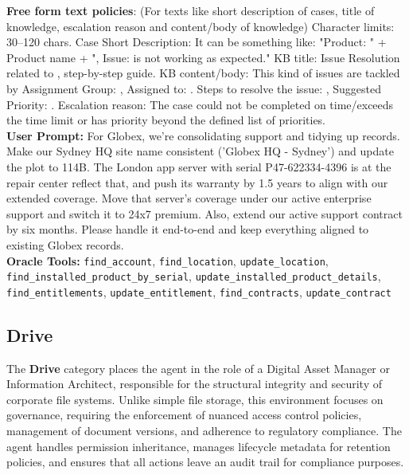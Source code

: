 \begin{taskbox}
\textbf{Free form text policies}: (For texts like short description of cases, title of knowledge, escalation reason and content/body of knowledge) Character limits: 30–120 chars. Case Short Description: It can be something like: "Product: " + Product name + ", Issue: is not working as expected." KB title: Issue Resolution related to , step-by-step guide. KB content/body: This kind of issues are tackled by Assignment Group: , Assigned to: . Steps to resolve the issue: , Suggested Priority: . Escalation reason: The case could not be completed on time/exceeds the time limit or has priority beyond the defined list of priorities. \\

\textbf{User Prompt:} For Globex, we're consolidating support and tidying up records. Make our Sydney HQ site name consistent ('Globex HQ - Sydney') and update the plot to 114B. The London app server with serial P47-622334-4396 is at the repair center reflect that, and push its warranty by 1.5 years to align with our extended coverage. Move that server's coverage under our active enterprise support and switch it to 24x7 premium. Also, extend our active support contract by six months. Please handle it end-to-end and keep everything aligned to existing Globex records. \\

\textbf{Oracle Tools:} \texttt{find\_account}, \texttt{find\_location}, \texttt{update\_location}, \texttt{find\_installed\_product\_by\_serial}, \texttt{update\_installed\_product\_details}, \texttt{find\_entitlements}, \texttt{update\_entitlement}, \texttt{find\_contracts}, \texttt{update\_contract}
\end{taskbox}

\subsection{Drive}
\label{app:cat_drive}

The \textbf{Drive} category places the agent in the role of a Digital Asset Manager or Information Architect, responsible for the structural integrity and security of corporate file systems. Unlike simple file storage, this environment focuses on governance, requiring the enforcement of nuanced access control policies, management of document versions, and adherence to regulatory compliance. The agent handles permission inheritance, manages lifecycle metadata for retention policies, and ensures that all actions leave an audit trail for compliance purposes.

